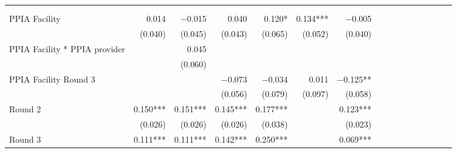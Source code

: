 \begin{tabular}{@{\extracolsep{5pt}}lrrrrrrrrrrrrrrr}
\toprule
& \multicolumn{1}{p{0.13\linewidth}}{\centering{(1)}} & \multicolumn{1}{p{0.13\linewidth}}{\centering{(2)}} & \multicolumn{1}{p{0.13\linewidth}}{\centering{(3)}} & \multicolumn{1}{p{0.13\linewidth}}{\centering{(4)}} & \multicolumn{1}{p{0.13\linewidth}}{\centering{(5)}} & \multicolumn{1}{p{0.13\linewidth}}{\centering{(6)}} \\
& \multicolumn{1}{p{0.13\linewidth}}{\centering{Pooled Model}} & \multicolumn{1}{p{0.13\linewidth}}{\centering{PPIA Interaction}} & \multicolumn{1}{p{0.13\linewidth}}{\centering{Separate Effects}} & \multicolumn{1}{p{0.13\linewidth}}{\centering{Wave Identification}} & \multicolumn{1}{p{0.13\linewidth}}{\centering{Facility Identification}} & \multicolumn{1}{p{0.13\linewidth}}{\centering{Non$-$PPIA Providers}} \\
\hline
PPIA Facility & 0.014\phantom{\phantom{)}***} & $-$0.015\phantom{\phantom{)}***} & 0.040\phantom{\phantom{)}***} & 0.120\phantom{)}*\phantom{**} & 0.134\phantom{)}*** & $-$0.005\phantom{\phantom{)}***} \\
& (0.040)\phantom{***} & (0.045)\phantom{***} & (0.043)\phantom{***} & (0.065)\phantom{***} & (0.052)\phantom{***} & (0.040)\phantom{***} \\
PPIA Facility * PPIA provider & \phantom{***} & 0.045\phantom{\phantom{)}***} & \phantom{***} & \phantom{***} & \phantom{***} & \phantom{***} \\
& \phantom{***} & (0.060)\phantom{***} & \phantom{***} & \phantom{***} & \phantom{***} & \phantom{***} \\
PPIA Facility Round 3 & \phantom{***} & \phantom{***} & $-$0.073\phantom{\phantom{)}***} & $-$0.034\phantom{\phantom{)}***} & 0.011\phantom{\phantom{)}***} & $-$0.125\phantom{)}**\phantom{*} \\
& \phantom{***} & \phantom{***} & (0.056)\phantom{***} & (0.079)\phantom{***} & (0.097)\phantom{***} & (0.058)\phantom{***} \\
Round 2 & 0.150\phantom{)}*** & 0.151\phantom{)}*** & 0.145\phantom{)}*** & 0.177\phantom{)}*** & \phantom{***} & 0.123\phantom{)}*** \\
& (0.026)\phantom{***} & (0.026)\phantom{***} & (0.026)\phantom{***} & (0.038)\phantom{***} & \phantom{***} & (0.023)\phantom{***} \\
Round 3 & 0.111\phantom{)}*** & 0.111\phantom{)}*** & 0.142\phantom{)}*** & 0.250\phantom{)}*** & \phantom{***} & 0.069\phantom{)}*** \\

\end{tabular}
